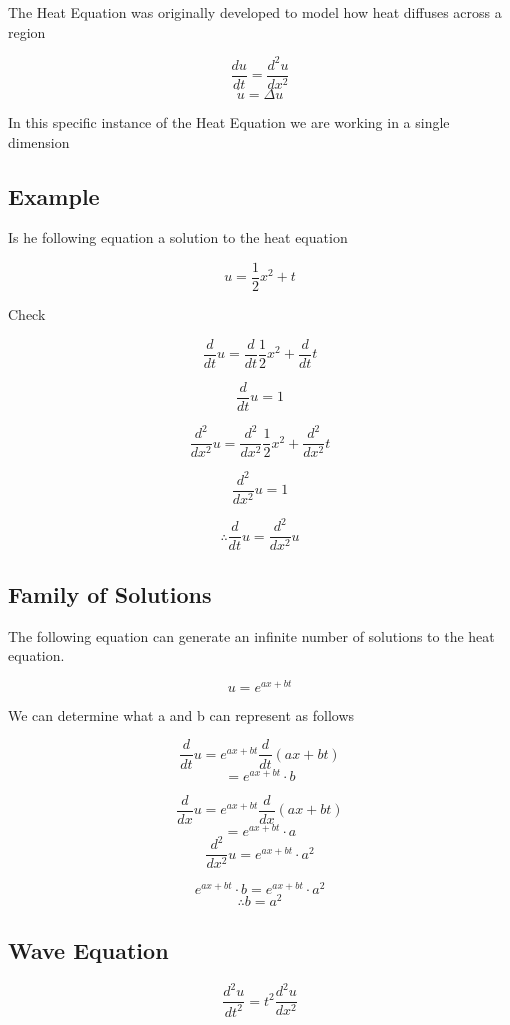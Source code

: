 \documentclass[10pt,a4paper]{report}
\begin{document}
The Heat Equation was originally developed to model how heat diffuses across a region

\begin{equation}
	\frac{du}{dt} = \frac{d^2u}{dx^2}
\end{equation}
\begin{equation}
	\dot u = \Delta u
\end{equation}

In this specific instance of the Heat Equation we are working in a single dimension

\subsection*{Example}

Is he following equation a solution to the heat equation

\[ u = \frac{1}{2} x^2 + t \]

Check

\[ \frac{d}{dt} u = \frac{d}{dt}\frac{1}{2}x^2 + \frac{d}{dt} t\]

\[ \frac{d}{dt} u = 1\]

\[ \frac{d^2}{dx^2} u = \frac{d^2}{dx^2}\frac{1}{2}x^2 + \frac{d^2}{dx^2} t\]

\[ \frac{d^2}{dx^2} u = 1\]

\[\therefore \frac{d}{dt} u = \frac{d^2}{dx^2} u \]
\subsection*{Family of Solutions}

The following equation can generate an infinite number of solutions to the heat equation.

\[ u = e ^{ax + bt}\]

We can determine what a and b can represent as follows

\[ \frac{d}{dt} u = e ^{ax + bt} \frac{d}{dt} (ax+bt)\]
\[ = e^{ax + bt}\cdot b\]

\[ \frac{d}{dx} u = e ^{ax + bt}\frac{d}{dx} (ax+bt)\]
\[ = e^{ax + bt}\cdot a\]
\[ \frac{d^2}{dx^2} u=e^{ax + bt}\cdot a^2\]

\[ e^{ax + bt}\cdot b=e^{ax + bt}\cdot a^2\]
\[ \therefore b=a^2\]

\subsection{Wave Equation}

\begin{equation}
	\frac{d^2u}{dt^2} = t^2 \frac{d^2u}{dx^2}
\end{equation}
\end{document}
